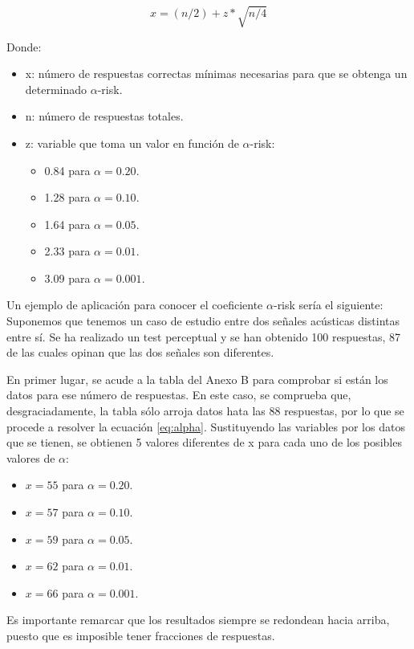 \documentclass[11pt,a4paper]{book}
\begin{document}
            \begin{equation}
                x=(n/2)+z*\sqrt{n/4}
                \label{eq:alpha}
            \end{equation}
            
            Donde:
            \begin{itemize}
                \item x: número de respuestas correctas mínimas necesarias para que se obtenga un determinado $\alpha$-risk.
                \item n: número de respuestas totales.
                \item z: variable que toma un valor en función de $\alpha$-risk:
                \begin{itemize}
                    \item 0.84 para $\alpha=0.20$.
                    \item 1.28 para $\alpha=0.10$.
                    \item 1.64 para $\alpha=0.05$.
                    \item 2.33 para $\alpha=0.01$.
                    \item 3.09 para $\alpha=0.001$.
                    
                \end{itemize}
            \end{itemize}
            
            Un ejemplo de aplicación para conocer el coeficiente $\alpha$-risk sería el siguiente: Suponemos que tenemos un caso de estudio entre dos señales acústicas distintas entre sí.  Se ha realizado un test perceptual y se han obtenido 100 respuestas, 87 de las cuales opinan que las dos señales son diferentes.
            
            En primer lugar, se acude a la tabla del Anexo B para comprobar si están los datos para ese número de respuestas. En este caso, se comprueba que, desgraciadamente, la tabla sólo arroja datos hata las 88 respuestas, por lo que se procede a resolver la ecuación \ref{eq:alpha}. Sustituyendo las variables por los datos que se tienen, se obtienen 5 valores diferentes de x para cada uno de los posibles valores de $\alpha$:
            \begin{itemize}
                \item $x=55$ para $\alpha=0.20$.
                \item $x=57$ para $\alpha=0.10$.
                \item $x=59$ para $\alpha=0.05$.
                \item $x=62$ para $\alpha=0.01$.
                \item $x=66$ para $\alpha=0.001$.
            \end{itemize}
            Es importante remarcar que los resultados siempre se redondean hacia arriba, puesto que es imposible tener fracciones de respuestas.
            
\end{document}
